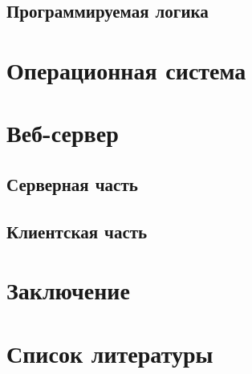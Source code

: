 \documentclass[a4paper, 12pt]{article}
\begin{document}
    \subsection{Программируемая логика}
    

\section{Операционная система}

\section{Веб-сервер}
    \subsection{Серверная часть}
    
    \subsection{Клиентская часть}
    

\section{Заключение}

\section{Список литературы}
\end{document}
